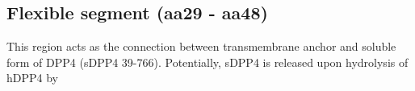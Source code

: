 \subsection{Flexible segment (aa29 - aa48)}

This region acts as the connection between transmembrane anchor and soluble form of DPP4 (sDPP4 39-766). Potentially, sDPP4 is released upon hydrolysis of hDPP4 by 
